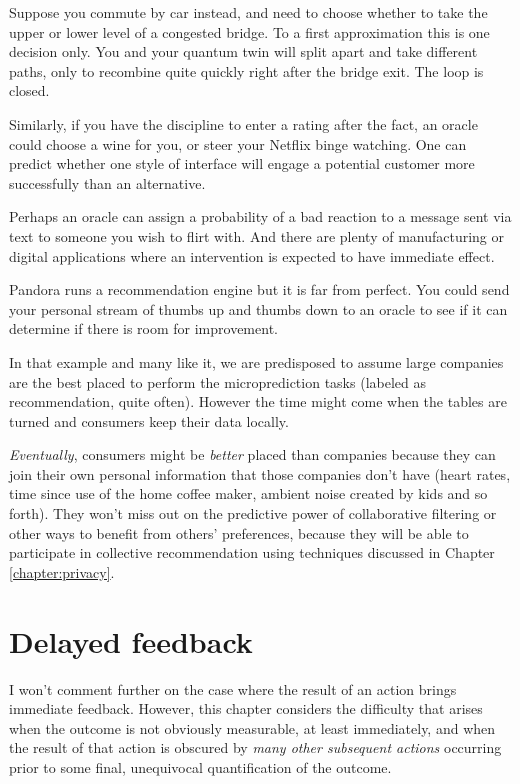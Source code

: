 Suppose you commute by car instead, and need to choose whether to take the upper or lower level of a congested bridge. To a first approximation this is one decision only. You and your quantum twin will split apart and take different paths, only to recombine quite quickly right after the bridge exit. The loop is closed. 


Similarly, if you have the discipline to enter a rating after the fact, an oracle could choose a wine for you, or steer your Netflix binge watching. One can predict whether one style of interface will engage a potential customer more successfully than an alternative. 


Perhaps an oracle can assign a probability of a bad reaction to a message sent via text to someone you wish to flirt with. And there are plenty of manufacturing or digital applications where an intervention is expected to have immediate effect. 


Pandora runs a recommendation engine but it is far from perfect. You could send your personal stream of thumbs up and thumbs down to an oracle to see if it can determine if there is room for improvement. 

In that example and many like it, we are predisposed to assume large companies are the best placed to perform the microprediction tasks (labeled as recommendation, quite often). However the time might come when the tables are turned and consumers keep their data locally. 

{\em Eventually}, consumers might be {\em better} placed than companies because they can join their own personal information that those companies don't have (heart rates, time since use of the home coffee maker, ambient noise created by kids and so forth). They won't miss out on the predictive power of collaborative filtering or other ways to benefit from others' preferences, because they will be able to participate in collective recommendation using techniques discussed in Chapter \ref{chapter:privacy}.   

\section{Delayed feedback}

I won't comment further on the case where the result of an action brings immediate feedback. However, this chapter considers the difficulty that arises when the outcome is not obviously measurable, at least immediately, and when the result of that action is obscured by {\em many other subsequent actions} occurring prior to some final, unequivocal quantification of the outcome. 


